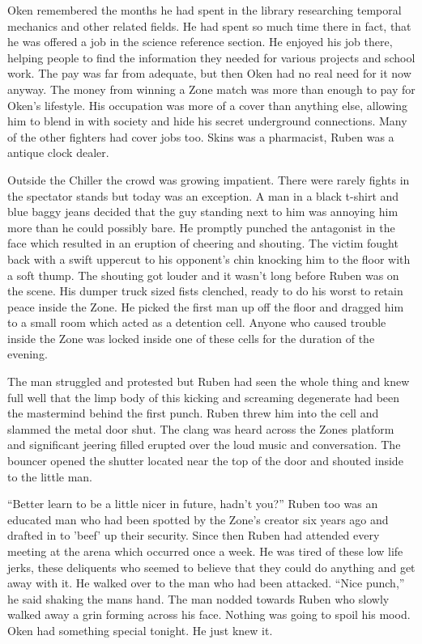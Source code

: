 Oken remembered the months he had spent in the library researching temporal mechanics and other related fields. He had spent so much time there in fact, that he was offered a job in the science reference section. He enjoyed his job there, helping people to find the information they needed for various projects and school work. The pay was far from adequate, but then Oken had no real need for it now anyway. The money from winning a Zone match was more than enough to pay for Oken's lifestyle. His occupation was more of a cover than anything else, allowing him to blend in with society and hide his secret underground connections. Many of the other fighters had cover jobs too. Skins was a pharmacist, Ruben was a antique clock dealer.

Outside the Chiller the crowd was growing impatient. There were rarely fights in the spectator stands but today was an exception. A man in a black t-shirt and blue baggy jeans decided that the guy standing next to him was annoying him more than he could possibly bare. He promptly punched the antagonist in the face which resulted in an eruption of cheering and shouting. The victim fought back with a swift uppercut to his opponent's chin knocking him to the floor with a soft thump. The shouting got louder and it wasn't long before Ruben was on the scene. His dumper truck sized fists clenched, ready to do his worst to retain peace inside the Zone. He picked the first man up off the floor and dragged him to a small room which acted as a detention cell. Anyone who caused trouble inside the Zone was locked inside one of these cells for the duration of the evening.

The man struggled and protested but Ruben had seen the whole thing and knew full well that the limp body of this kicking and screaming degenerate had been the mastermind behind the first punch. Ruben threw him into the cell and slammed the metal door shut. The clang was heard across the Zones platform and significant jeering filled erupted over the loud music and conversation. The bouncer opened the shutter located near the top of the door and shouted inside to the little man.

``Better learn to be a little nicer in future, hadn't you?'' Ruben too was an educated man who had been spotted by the Zone's creator six years ago and drafted in to 'beef' up their security. Since then Ruben had attended every meeting at the arena which occurred once a week. He was tired of these low life jerks, these deliquents who seemed to believe that they could do anything and get away with it. He walked over to the man who had been attacked. ``Nice punch,'' he said shaking the mans hand. The man nodded towards Ruben who slowly walked away a grin forming across his face. Nothing was going to spoil his mood. Oken had something special tonight. He just knew it.

